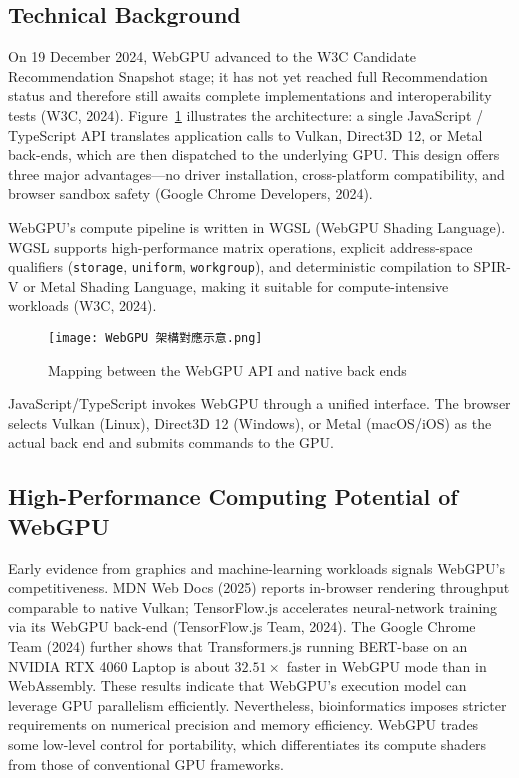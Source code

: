 \documentclass[PhD]{PHlab-thesis}
\begin{document}
\subsection{Technical Background}
On 19 December 2024, WebGPU advanced to the W3C Candidate Recommendation Snapshot stage; it has not yet reached full Recommendation status and therefore still awaits complete implementations and interoperability tests (W3C, 2024). Figure~\ref{fig:webgpu-mapping} illustrates the architecture: a single JavaScript / TypeScript API translates application calls to Vulkan, Direct3D 12, or Metal back-ends, which are then dispatched to the underlying GPU. This design offers three major advantages—no driver installation, cross-platform compatibility, and browser sandbox safety (Google Chrome Developers, 2024).

WebGPU's compute pipeline is written in WGSL (WebGPU Shading Language). WGSL supports high-performance matrix operations, explicit address-space qualifiers (\verb|storage|, \verb|uniform|, \verb|workgroup|), and deterministic compilation to SPIR-V or Metal Shading Language, making it suitable for compute-intensive workloads (W3C, 2024).


\begin{figure}[htbp]
    \centering
    \texttt{[image: WebGPU 架構對應示意.png]}
    \caption{Mapping between the WebGPU API and native back ends}
    \label{fig:webgpu-mapping}
\end{figure}

JavaScript/TypeScript invokes WebGPU through a unified interface. The browser selects Vulkan (Linux), Direct3D 12 (Windows), or Metal (macOS/iOS) as the actual back end and submits commands to the GPU.

\subsection{High-Performance Computing Potential of WebGPU}
Early evidence from graphics and machine-learning workloads signals WebGPU's competitiveness. MDN Web Docs (2025) reports in-browser rendering throughput comparable to native Vulkan; TensorFlow.js accelerates neural-network training via its WebGPU back-end (TensorFlow.js Team, 2024). The Google Chrome Team (2024) further shows that Transformers.js running BERT-base on an NVIDIA RTX 4060 Laptop is about $32.51\times$ faster in WebGPU mode than in WebAssembly. These results indicate that WebGPU's execution model can leverage GPU parallelism efficiently.  
Nevertheless, bioinformatics imposes stricter requirements on numerical precision and memory efficiency. WebGPU trades some low-level control for portability, which differentiates its compute shaders from those of conventional GPU frameworks.
\end{document}
